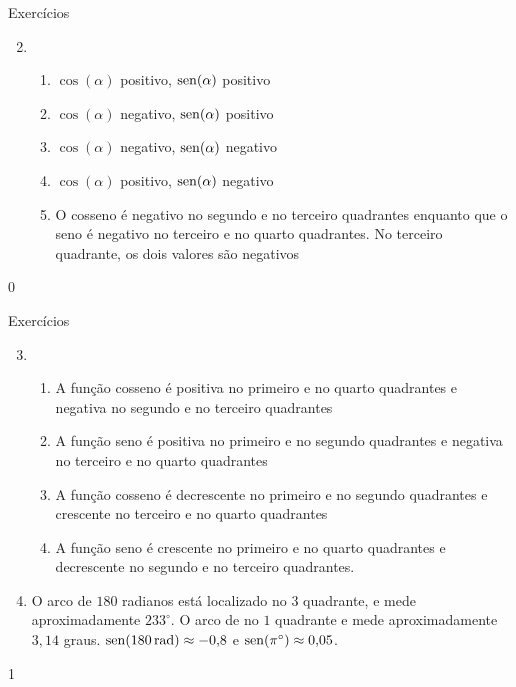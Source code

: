\marginpar{\vspace{-1em}}
\begin{answer}{Exercícios}
{\exerciselist
\begin{enumerate}\setcounter{enumi}{1}
\item 
\begin{enumerate}
\item $\cos(\alpha)$ positivo, $\operatorname{sen}(\alpha)$ positivo
\item $\cos(\alpha)$ negativo, $\operatorname{sen}(\alpha)$ positivo
\item $\cos(\alpha)$ negativo, $\operatorname{sen}(\alpha)$ negativo
\item $\cos(\alpha)$ positivo, $\operatorname{sen}(\alpha)$ negativo
\item O cosseno é negativo no segundo e no terceiro quadrantes enquanto que o seno é negativo no terceiro e no quarto quadrantes. No terceiro quadrante, os dois valores são negativos
\end{enumerate}
\end{enumerate}
}{0}
\end{answer}
\clearmargin
\begin{answer}{Exercícios}
{\exerciselist
\begin{enumerate}\setcounter{enumi}{2}
\item 
\begin{enumerate}
\item A função cosseno é positiva no primeiro e no quarto quadrantes e negativa no segundo e no terceiro quadrantes
\item A função seno é positiva no primeiro e no segundo quadrantes e negativa no terceiro e no quarto quadrantes
\item A função cosseno é decrescente no primeiro e no segundo quadrantes e crescente no terceiro e no quarto quadrantes
\item A função seno é crescente no primeiro e no quarto quadrantes e decrescente no segundo e no terceiro quadrantes.
\end{enumerate}
\item O arco de $180$ radianos está localizado no $3$ quadrante, e mede aproximadamente $233^{\circ}$. O arco de no $1$ quadrante e mede aproximadamente $3{,}14$ graus. $\operatorname{sen}(180\operatorname{rad})\approx-0{,}8$ e $\operatorname{sen}(\pi^{\circ})\approx0{,}05$.
\end{enumerate}
}{1}
\end{answer}
\marginpar{\hrulefill}
\def\currentcolor{session3}
